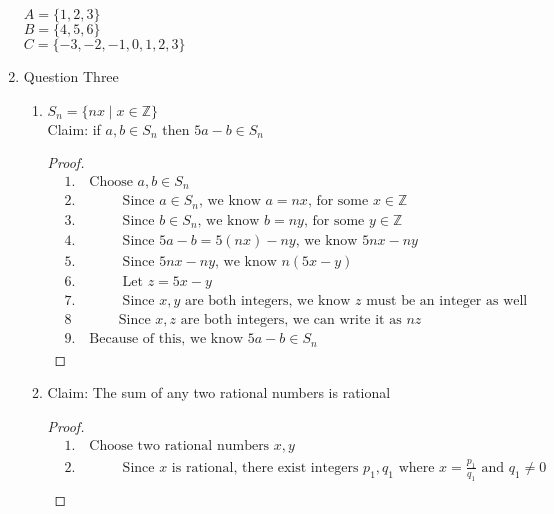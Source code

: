 \documentclass{article}
\begin{document}
\begin{enumerate}
    $A = \{1,2,3\}$ \\
    $B = \{4,5,6\}$ \\
    $C = \{-3,-2,-1,0,1,2,3\}$
    \item Question Three
    \begin{enumerate}
        \item $S_n = \{nx \mid x \in \mathbb{Z}\}$ \\
        Claim: if $a, b \in S_n$ then $5a - b \in S_n$
        \begin{proof}
            \begin{align*}
                &1. \quad \text{Choose } a,b \in S_n \\
                &2. \hspace{1cm} \quad \text{Since } a \in S_n \text{, we know } a = nx \text{, for some } x \in \mathbb{Z} \\
                &3. \hspace{1cm} \quad \text{Since } b \in S_n \text{, we know } b = ny \text{, for some } y \in \mathbb{Z} \\
                &4. \hspace{1cm} \quad \text{Since } 5a - b = 5(nx) - ny \text{, we know } 5nx - ny \\
                &5. \hspace{1cm} \quad \text{Since } 5nx - ny \text{, we know } n(5x - y) \\
                &6. \hspace{1cm} \quad \text{Let } z = 5x - y \\
                &7. \hspace{1cm} \quad \text{Since } x, y \text{ are both integers, we know } z \text{ must be an integer as well} \\
                &8  \hspace{1cm} \quad \text{Since } x, z \text{ are both integers, we can write it as } nz \\
                &9. \quad \text{Because of this, we know } 5a - b \in S_n
            \end{align*}
        \end{proof}
        \item Claim: The sum of any two rational numbers is rational
        \begin{proof}
            \begin{align*}
                &1. \quad \text{Choose two rational numbers } x,y \\
                &2. \hspace{1cm} \quad \text{Since } x \text{ is rational, there exist integers } p_1,q_1 \text{ where } x = \frac{p_1}{q_1} \text{ and } q_1 \neq 0 \\

\end{align*}
\end{proof}
\end{enumerate}
\end{enumerate}
\end{document}
